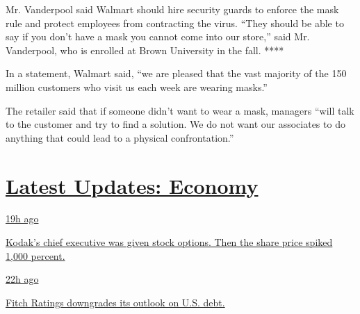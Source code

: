 Mr. Vanderpool said Walmart should hire security guards to enforce the
mask rule and protect employees from contracting the virus. ``They
should be able to say if you don't have a mask you cannot come into our
store,'' said Mr. Vanderpool, who is enrolled at Brown University in the
fall. ****

In a statement, Walmart said, ``we are pleased that the vast majority of
the 150 million customers who visit us each week are wearing masks.''

The retailer said that if someone didn't want to wear a mask, managers
``will talk to the customer and try to find a solution. We do not want
our associates to do anything that could lead to a physical
confrontation.''

\hypertarget{latest-updates-economy}{%
\section{\texorpdfstring{\href{https://www.nytimes3xbfgragh.onion/live/2020/07/31/business/stock-market-today-coronavirus?action=click\&pgtype=Article\&state=default\&region=MAIN_CONTENT_1\&context=storylines_live_updates}{Latest
Updates:
Economy}}{Latest Updates: Economy}}\label{latest-updates-economy}}

\href{https://www.nytimes3xbfgragh.onion/live/2020/07/31/business/stock-market-today-coronavirus?action=click\&pgtype=Article\&state=default\&region=MAIN_CONTENT_1\&context=storylines_live_updates\#kodaks-chief-executive-was-given-stock-options-then-the-share-price-spiked-1000-percent}{19h
ago}

\href{https://www.nytimes3xbfgragh.onion/live/2020/07/31/business/stock-market-today-coronavirus?action=click\&pgtype=Article\&state=default\&region=MAIN_CONTENT_1\&context=storylines_live_updates\#kodaks-chief-executive-was-given-stock-options-then-the-share-price-spiked-1000-percent}{Kodak's
chief executive was given stock options. Then the share price spiked
1,000 percent.}

\href{https://www.nytimes3xbfgragh.onion/live/2020/07/31/business/stock-market-today-coronavirus?action=click\&pgtype=Article\&state=default\&region=MAIN_CONTENT_1\&context=storylines_live_updates\#fitch-ratings-downgrades-its-outlook-on-us-debt}{22h
ago}

\href{https://www.nytimes3xbfgragh.onion/live/2020/07/31/business/stock-market-today-coronavirus?action=click\&pgtype=Article\&state=default\&region=MAIN_CONTENT_1\&context=storylines_live_updates\#fitch-ratings-downgrades-its-outlook-on-us-debt}{Fitch
Ratings downgrades its outlook on U.S. debt.}


